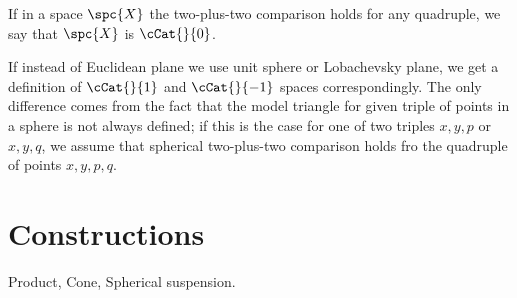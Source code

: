 If in a space $\spc{X}$ the two-plus-two comparison holds for any quadruple,
we say that $\spc{X}$ is $\cCat{}{0}$.

If instead of Euclidean plane we use unit sphere or Lobachevsky plane,
we get a definition of $\cCat{}{1}$ and $\cCat{}{-1}$ spaces correspondingly.
The only difference comes from the fact that the model triangle for given triple of points in a sphere is not always defined; 
if this is the case for one of two triples $x,y,p$ or $x,y,q$, we assume that spherical two-plus-two comparison holds fro the quadruple of points $x,y,p,q$.

\section{Constructions}

Product, Cone, Spherical suspension.